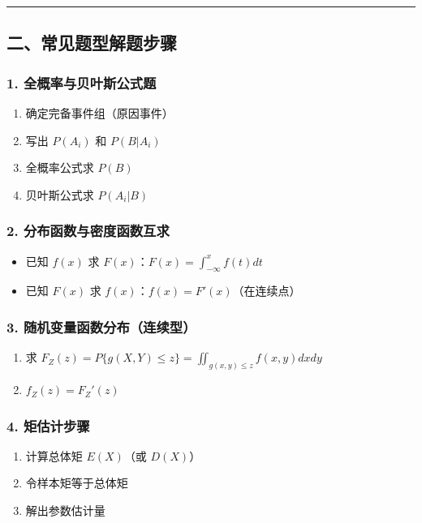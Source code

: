 \documentclass[12pt,a4paper]{ctexart}
\begin{document}
\vspace{1em}\hrule\vspace{1em}

\subsection{二、常见题型解题步骤}

\subsubsection{1. 全概率与贝叶斯公式题}
\begin{enumerate}[noitemsep]
    \item 确定完备事件组（原因事件）
    \item 写出 $P(A_i)$ 和 $P(B|A_i)$
    \item 全概率公式求 $P(B)$
    \item 贝叶斯公式求 $P(A_i|B)$
\end{enumerate}

\subsubsection{2. 分布函数与密度函数互求}
\begin{itemize}[noitemsep]
    \item 已知 $f(x)$ 求 $F(x)$：$F(x) = \int_{-\infty}^x f(t) dt$
    \item 已知 $F(x)$ 求 $f(x)$：$f(x) = F'(x)$（在连续点）
\end{itemize}

\subsubsection{3. 随机变量函数分布（连续型）}
\begin{enumerate}[noitemsep]
    \item 求 $F_Z(z) = P\{g(X,Y) \le z\} = \iint_{g(x,y) \le z} f(x,y) dx dy$
    \item $f_Z(z) = F_Z'(z)$
\end{enumerate}

\subsubsection{4. 矩估计步骤}
\begin{enumerate}[noitemsep]
    \item 计算总体矩 $E(X)$（或 $D(X)$）
    \item 令样本矩等于总体矩
    \item 解出参数估计量
\end{enumerate}
\end{document}
